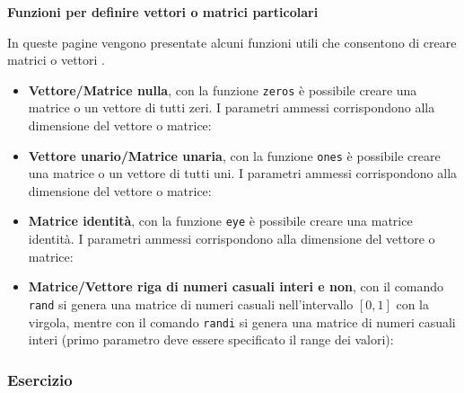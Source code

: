 \newpage

\begin{flushleft}
    \large
    \hypertarget{
        lab: Funzioni per definire vettori o matrici particolari
    }{
        \textcolor{Red3}{\textbf{Funzioni per definire vettori o matrici particolari}}
    }
    \label{lab: Funzioni per definire vettori o matrici particolari}
\end{flushleft}
In queste pagine vengono presentate alcuni funzioni utili che consentono di creare matrici o vettori .
\begin{itemize}
    \item \textbf{Vettore/Matrice nulla}, con la funzione \texttt{zeros} è possibile creare una matrice o un vettore di tutti zeri. I parametri ammessi corrispondono alla dimensione del vettore o matrice:
    

    \item \textbf{Vettore unario/Matrice unaria}, con la funzione \texttt{ones} è possibile creare una matrice o un vettore di tutti uni. I parametri ammessi corrispondono alla dimensione del vettore o matrice:
    

    \newpage

    \item \textbf{Matrice identità}, con la funzione \texttt{eye} è possibile creare una matrice identità. I parametri ammessi corrispondono alla dimensione del vettore o matrice:
    

    \item \textbf{Matrice/Vettore riga di numeri casuali interi e non}, con il comando \texttt{rand} si genera una matrice di numeri casuali nell'intervallo $\left[0,1\right]$ con la virgola, mentre con il comando \texttt{randi} si genera una matrice di numeri casuali interi (primo parametro deve essere specificato il range dei valori):
    
\end{itemize}

\newpage

\subsubsection{Esercizio}

